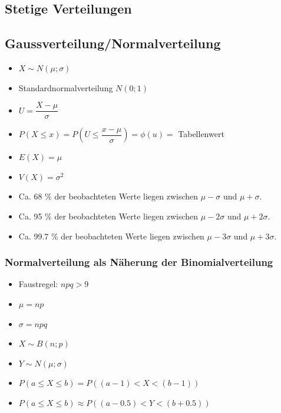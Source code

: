 \documentclass[8pt,a4paper]{scrartcl}
\begin{document}
\begin{multicols*}{3}
		\section{Stetige Verteilungen}
			\subsection{Gaussverteilung/Normalverteilung}
				\begin{itemize}\itemsep0pt				
					\item $X \sim N(\mu ;\sigma )$
					\item Standardnormalverteilung $N(0;1)$
					\item $U=\dfrac{X-\mu}{\sigma}$
					\item $P(X\leq x)= P(U \leq \dfrac{x-\mu}{\sigma}) = \phi(u)=$ Tabellenwert
					\item $E(X)=\mu$
					\item $V(X)=\sigma^{2}$
					\item Ca. 68 \% der beobachteten Werte liegen zwischen $\mu - \sigma$ und $\mu + \sigma$.
					\item Ca. 95 \% der beobachteten Werte liegen zwischen $\mu - 2\sigma$ und $\mu + 2\sigma$.
					\item Ca. 99.7 \% der beobachteten Werte liegen zwischen $\mu - 3\sigma$ und $\mu + 3\sigma$.
				\end{itemize}	
				
				\subsubsection{Normalverteilung als Näherung der Binomialverteilung}		
					\begin{itemize}\itemsep0pt				
						\item Faustregel: $npq > 9$
						\item $\mu = np$
						\item $\sigma = npq$
						\item $X \sim B(n;p)$
						\item $Y \sim N(\mu;\sigma)$
						\item $P(a\leq X \leq b) = P((a-1) < X < (b-1)) $
						\item $P(a\leq X \leq b) \approx P((a-0.5) < Y < (b+0.5)) $
					\end{itemize}			
				

\end{multicols*}
\end{document}
